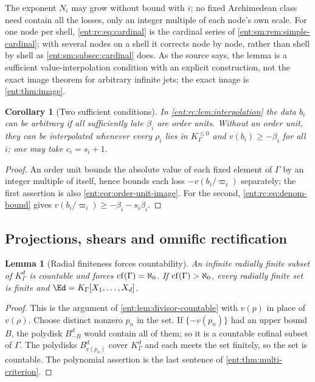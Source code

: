 \documentclass[11pt]{article}
\theoremstyle{plain}
\newtheorem{lemma}[lemma]{Lemma}
\theoremstyle{plain}
\theoremstyle{plain}
\newtheorem{corollary}[corollary]{Corollary}
\theoremstyle{definition}
\theoremstyle{definition}
\theoremstyle{definition}
\theoremstyle{definition}
\theoremstyle{remark}
\newcommand{\K}{K_\Gamma}\newcommand{\KD}{K_\Delta}
\newcommand{\Kle}{K_\Gamma^{\le0}}\DeclareMathOperator{\Jac}{Jac}
\begin{document}
The exponent $N_i$ may grow without bound with $i$; no fixed Archimedean
class need contain all the losses, only an integer multiple of each node's
own scale. For one node per shell, \eqref{ent:rc:eq:cardinal} is the
cardinal series of \cref{ent:sm:rem:simple-cardinal}; with several nodes on a
shell it corrects node by node, rather than shell by shell as
\cref{ent:sm:subsec:cardinal} does. As the source says, the lemma is a
sufficient value-interpolation condition with an explicit construction, not
the exact image theorem for arbitrary infinite jets; the exact image is
\cref{ent:thm:image}.

\begin{corollary}[Two sufficient conditions]\label{ent:rc:cor:interp-cases}
In \cref{ent:rc:lem:interpolation} the data $b_i$ can be arbitrary if all
sufficiently late $\beta_i$ are order units. Without an order unit, they can
be interpolated whenever every $\rho_i$ lies in $\Kle$ and
$v(b_i)\ge-\beta_i$ for all $i$; one may take $c_i=s_i+1$.
\end{corollary}
\begin{proof}
An order unit bounds the absolute value of each fixed element of $\Gamma$ by
an integer multiple of itself, hence bounds each loss $-v(b_i/\varpi_i)$
separately; the first assertion is also \cref{ent:cor:order-unit-image}. For
the second, \eqref{ent:rc:eq:denom-bound} gives
$v(b_i/\varpi_i)\ge-\beta_i-s_i\beta_i$.
\end{proof}

\subsection{Projections, shears and omnific rectification}
\label{ent:rc:subsec:rectification}

\begin{lemma}[Radial finiteness forces countability]\label{ent:rc:lem:countable}
An infinite radially finite subset of $\K^d$ is countable and forces
$\operatorname{cf}(\Gamma)=\aleph_0$. If $\operatorname{cf}(\Gamma)>\aleph_0$, every radially finite set
is finite and $\Ed=\K[X_1,\ldots,X_d]$.
\end{lemma}
\begin{proof}
This is the argument of \cref{ent:lem:divisor-countable} with $v(p)$ in place
of $v(\rho)$. Choose distinct nonzero $p_n$ in the set. If
$\{-v(p_n)\}$ had an upper bound $B$, the polydisk $B^d_{-B}$ would contain
all of them; so it is a countable cofinal subset of $\Gamma$. The polydisks
$B^d_{v(p_n)}$ cover $\K^d$ and each meets the set finitely, so the set is
countable. The polynomial assertion is the last sentence of
\cref{ent:thm:multi-criterion}.
\end{proof}
\end{document}
